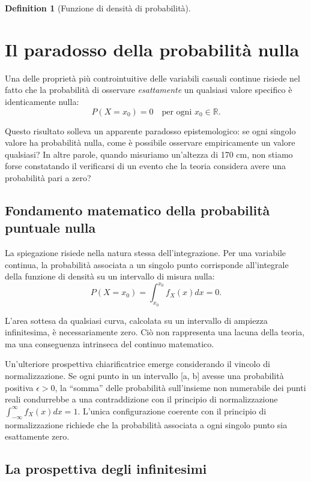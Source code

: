 \documentclass[
  letterpaper,
  DIV=11,
  numbers=noendperiod,
  oneside]{scrreprt}
\theoremstyle{definition}
\theoremstyle{plain}
\theoremstyle{definition}
\newtheorem{definition}{Definition}[chapter]
\theoremstyle{remark}
\begin{document}
\begin{definition}[Funzione di densità di
probabilità]
\section{Il paradosso della probabilità
nulla}\label{il-paradosso-della-probabilituxe0-nulla}

Una delle proprietà più controintuitive delle variabili casuali continue
risiede nel fatto che la probabilità di osservare \emph{esattamente} un
qualsiasi valore specifico è identicamente nulla: \[
P(X = x_0) = 0 \quad \text{per ogni } x_0 \in \mathbb{R}.
\]

Questo risultato solleva un apparente paradosso epistemologico: se ogni
singolo valore ha probabilità nulla, come è possibile osservare
empiricamente un valore qualsiasi? In altre parole, quando misuriamo
un'altezza di 170 cm, non stiamo forse constatando il verificarsi di un
evento che la teoria considera avere una probabilità pari a zero?

\subsection{Fondamento matematico della probabilità puntuale
nulla}\label{fondamento-matematico-della-probabilituxe0-puntuale-nulla}

La spiegazione risiede nella natura stessa dell'integrazione. Per una
variabile continua, la probabilità associata a un singolo punto
corrisponde all'integrale della funzione di densità su un intervallo di
misura nulla: \[
P(X = x_0) = \int_{x_0}^{x_0} f_X(x)  dx = 0.
\]

L'area sottesa da qualsiasi curva, calcolata su un intervallo di
ampiezza infinitesima, è necessariamente zero. Ciò non rappresenta una
lacuna della teoria, ma una conseguenza intrinseca del continuo
matematico.

Un'ulteriore prospettiva chiarificatrice emerge considerando il vincolo
di normalizzazione. Se ogni punto in un intervallo {[}a, b{]} avesse una
probabilità positiva \(\epsilon > 0\), la ``somma'' delle probabilità
sull'insieme non numerabile dei punti reali condurrebbe a una
contraddizione con il principio di normalizzazione
\(\int_{-\infty}^{\infty} f_X(x) dx = 1\). L'unica configurazione
coerente con il principio di normalizzazione richiede che la probabilità
associata a ogni singolo punto sia esattamente zero.

\subsection{La prospettiva degli
infinitesimi}\label{la-prospettiva-degli-infinitesimi}


\end{definition}
\end{document}
